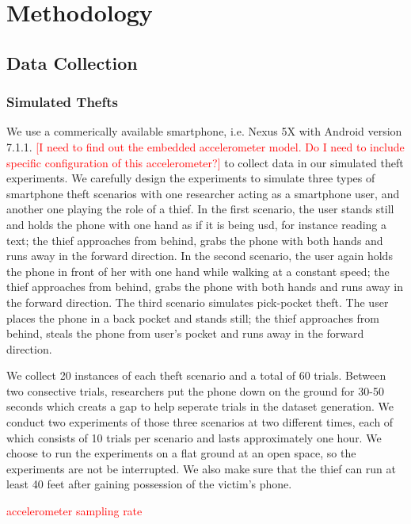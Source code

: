 \documentclass{soups}
\begin{document}
\section{Methodology}

\subsection{Data Collection}

\subsubsection{Simulated Thefts}
We use a commerically available smartphone, i.e. Nexus 5X with Android version 7.1.1. \textcolor{red}{[I need to find out the embedded accelerometer model. Do I need to include specific configuration of this accelerometer?]} to collect data in our simulated theft experiments. We carefully design the experiments to simulate three types of smartphone theft scenarios with one researcher acting as a smartphone user, and another one playing the role of a thief. In the first scenario, the user stands still and holds the phone with one hand as if it is being usd, for instance reading a text; the thief approaches from behind, grabs the phone with both hands and runs away in the forward direction. In the second scenario, the user again holds the phone in front of her with one hand while walking at a constant speed; the thief approaches from behind, grabs the phone with both hands and runs away in the forward direction. The third scenario simulates pick-pocket theft. The user places the phone in a back pocket and stands still; the thief approaches from behind, steals the phone from user's pocket and runs away in the forward direction.

We collect 20 instances of each theft scenario and a total of 60 trials. Between two consective trials, researchers put the phone down on the ground for 30-50 seconds which creats a gap to help seperate trials in the dataset generation. We conduct two experiments of those three scenarios at two different times, each of which consists of 10 trials per scenario and lasts approximately one hour. We choose to run the experiments on a flat ground at an open space, so the experiments are not be interrupted. We also make sure that the thief can run at least 40 feet after gaining possession of the victim's phone.

\textcolor{red}{accelerometer sampling rate}
\end{document}
